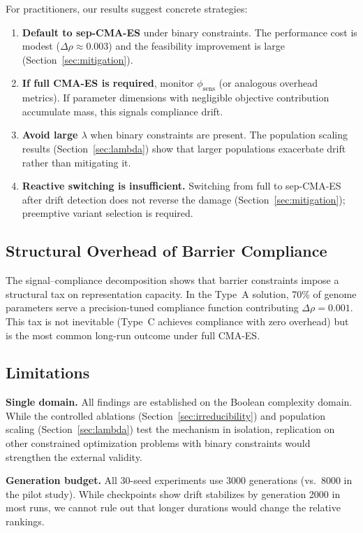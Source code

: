 \documentclass[twoside,11pt]{article}
\begin{document}
For practitioners, our results suggest concrete strategies:
\begin{enumerate}
\item \textbf{Default to sep-CMA-ES} under binary constraints. The performance
  cost is modest ($\Delta\rho \approx 0.003$) and the feasibility improvement is
  large (Section~\ref{sec:mitigation}).
\item \textbf{If full CMA-ES is required}, monitor $\phi_{\text{sens}}$ (or
  analogous overhead metrics). If parameter dimensions with negligible objective
  contribution accumulate mass, this signals compliance drift.
\item \textbf{Avoid large $\lambda$} when binary constraints are present.
  The population scaling results (Section~\ref{sec:lambda}) show that larger
  populations exacerbate drift rather than mitigating it.
\item \textbf{Reactive switching is insufficient.} Switching from full to
  sep-CMA-ES after drift detection does not reverse the damage
  (Section~\ref{sec:mitigation}); preemptive variant selection is required.
\end{enumerate}

\subsection{Structural Overhead of Barrier Compliance}

The signal--compliance decomposition shows that barrier constraints impose
a structural tax on representation capacity. In the Type~A solution, 70\% of
genome parameters serve a precision-tuned compliance function contributing
$\Delta\rho = 0.001$. This tax is not inevitable (Type~C achieves compliance
with zero overhead) but is the most common long-run outcome under full CMA-ES.

\subsection{Limitations}

\textbf{Single domain.} All findings are established on the Boolean complexity
domain. While the controlled ablations (Section~\ref{sec:irreducibility}) and
population scaling (Section~\ref{sec:lambda}) test the mechanism in isolation,
replication on other constrained optimization problems with binary constraints
would strengthen the external validity.

\textbf{Generation budget.} All 30-seed experiments use 3000 generations
(vs.\ 8000 in the pilot study). While checkpoints show drift stabilizes by
generation 2000 in most runs, we cannot rule out that longer durations would
change the relative rankings.
\end{document}

